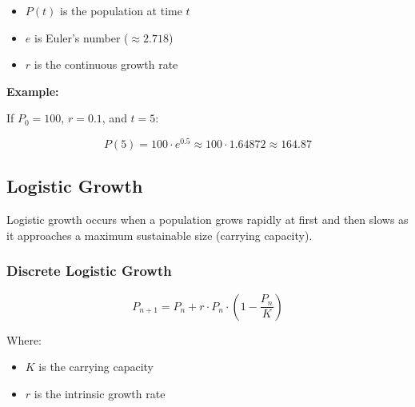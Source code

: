 \begin{itemize}

  \item \(P(t)\) is the population at time \(t\)

  \item \(e\) is Euler’s number (\(\approx 2.718\))

  \item \(r\) is the continuous growth rate

\end{itemize}

\textbf{Example:}

If \(P_0 = 100\), \(r = 0.1\), and \(t = 5\):

\[
    P(5) = 100 \cdot e^{0.5} \approx 100 \cdot 1.64872 \approx 164.87
\]

\begin{center}
\end{center}

\subsection{Logistic Growth}

Logistic growth occurs when a population grows rapidly at first and then slows as it approaches a maximum sustainable size (carrying capacity).

\subsubsection{Discrete Logistic Growth}

\[
    P_{n+1} = P_n + r \cdot P_n \cdot \left(1 - \frac{P_n}{K}\right)
\]

Where:

\begin{itemize}

  \item \(K\) is the carrying capacity

  \item \(r\) is the intrinsic growth rate

\end{itemize}

